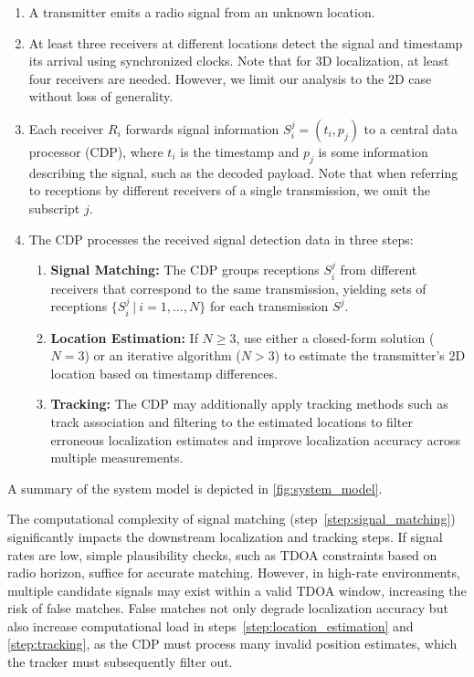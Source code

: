 \documentclass[sigconf, 10pt, nonacm, anonymous]{acmart}  %
\begin{document}
\begin{enumerate}
    \item A transmitter emits a radio signal from an unknown location.
    \item At least three receivers at different locations detect the signal and timestamp its arrival using synchronized clocks. Note that for 3D localization, at least four receivers are needed. However, we limit our analysis to the 2D case without loss of generality.
    \item Each receiver $R_i$ forwards signal information $S_i^j = (t_i, p_j)$ to a central data processor (CDP), where $t_i$ is the timestamp and $p_j$ is some information describing the signal, such as the decoded payload. Note that when referring to receptions by different receivers of a single transmission, we omit the subscript $j$.
    \item The CDP processes the received signal detection data in three steps:
    \begin{enumerate}[leftmargin=*]
        \item \textbf{Signal Matching:} The CDP groups receptions $S_i^j$ from different receivers that correspond to the same transmission, yielding sets of receptions $\{S_i^j\ |\ i = 1, \dots, N\}$ for each transmission $S^j$.  \label{step:signal_matching}
        \item \textbf{Location Estimation:} If $N \ge 3$, use either a closed-form solution ($N = 3$) or an iterative algorithm ($N > 3$) to estimate the transmitter’s 2D location based on timestamp differences. \label{step:location_estimation}
        \item \textbf{Tracking:} The CDP may additionally apply tracking methods such as track association and filtering to the estimated locations to filter erroneous localization estimates and improve localization accuracy across multiple measurements. \label{step:tracking}
    \end{enumerate}
\end{enumerate}
A summary of the system model is depicted in \autoref{fig:system_model}.
\bigskip

The computational complexity of signal matching (step~\ref{step:signal_matching}) significantly impacts the downstream localization and tracking steps. If signal rates are low, simple plausibility checks, such as TDOA constraints based on radio horizon, suffice for accurate matching. However, in high-rate environments, multiple candidate signals may exist within a valid TDOA window, increasing the risk of false matches. False matches not only degrade localization accuracy but also increase computational load in steps~\ref{step:location_estimation} and \ref{step:tracking}, as the CDP must process many invalid position estimates, which the tracker must subsequently filter out.
\end{document}
